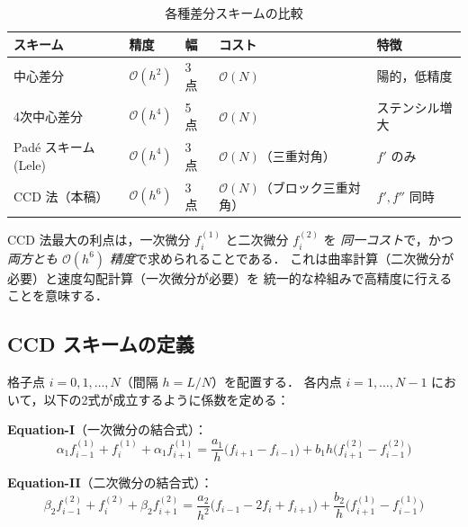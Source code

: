 \documentclass[12pt, a4paper, titlepage]{article}
\newcommand{\jp}[1]{{\normalfont\jpfont #1}}
\newcommand{\Ord}[1]{\mathcal{O}(#1)}
\newcommand{\fp}[1]{f^{(1)}_{#1}}
\newcommand{\fpp}[1]{f^{(2)}_{#1}}
\begin{document}
\begin{table}[h]
\centering
\caption{\jp{各種差分スキームの比較}}
\label{tab:scheme_compare}
\begin{tabular}{@{}lllll@{}}
\toprule
\jp{スキーム} & \jp{精度} & \jp{幅} & \jp{コスト} & \jp{特徴}\\
\midrule
\jp{中心差分} & $\Ord{h^2}$ & 3 \jp{点} & $\Ord{N}$ & \jp{陽的，低精度}\\
\jp{4次中心差分} & $\Ord{h^4}$ & 5 \jp{点} & $\Ord{N}$ & \jp{ステンシル増大}\\
Padé \jp{スキーム (Lele)} & $\Ord{h^4}$ & 3 \jp{点} & $\Ord{N}$\jp{（三重対角）} & \jp{$f'$ のみ}\\
\jp{CCD 法（本稿）} & $\Ord{h^6}$ & 3 \jp{点} & $\Ord{N}$\jp{（ブロック三重対角）} & \jp{$f', f''$ 同時}\\
\bottomrule
\end{tabular}
\end{table}

\jp{CCD 法最大の利点は，一次微分 $f^{(1)}_i$ と二次微分 $f^{(2)}_i$ を
\emph{同一コスト}で，かつ \emph{両方とも $\Ord{h^6}$ 精度}で求められることである．
これは曲率計算（二次微分が必要）と速度勾配計算（一次微分が必要）を
統一的な枠組みで高精度に行えることを意味する．}

\subsection{CCD \jp{スキームの定義}}

\jp{格子点 $i = 0, 1, \ldots, N$（間隔 $h = L/N$）を配置する．
各内点 $i = 1, \ldots, N-1$ において，以下の2式が成立するように係数を定める：}

\begin{tcolorbox}[mybox, title={CCD \jp{スキームの2方程式}}]
\textbf{Equation-I}\jp{（一次微分の結合式）：}
\begin{equation}
  \alpha_1\fp{i-1} + \fp{i} + \alpha_1\fp{i+1}
  = \frac{a_1}{h}\bigl(f_{i+1}-f_{i-1}\bigr)
  + b_1 h\bigl(\fpp{i+1}-\fpp{i-1}\bigr)
  \label{eq:CCD_I}
\end{equation}

\textbf{Equation-II}\jp{（二次微分の結合式）：}
\begin{equation}
  \beta_2\fpp{i-1} + \fpp{i} + \beta_2\fpp{i+1}
  = \frac{a_2}{h^2}\bigl(f_{i-1}-2f_i+f_{i+1}\bigr)
  + \frac{b_2}{h}\bigl(\fp{i+1}-\fp{i-1}\bigr)
  \label{eq:CCD_II}
\end{equation}
\end{tcolorbox}
\end{document}
